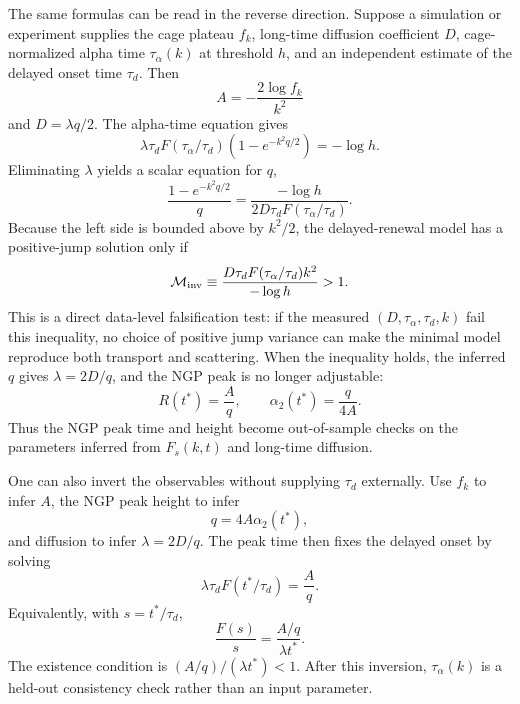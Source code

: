 \documentclass[aps,preprint,onecolumn,superscriptaddress,nofootinbib]{revtex4-2}
\begin{document}
The same formulas can be read in the reverse direction. Suppose a simulation or
experiment supplies the cage plateau $f_k$, long-time diffusion coefficient
$D$, cage-normalized alpha time $\tau_\alpha(k)$ at threshold $h$, and an
independent estimate of the delayed onset time $\tau_d$. Then
\begin{equation}
  A=-\frac{2\log f_k}{k^2}
\end{equation}
and $D=\lambda q/2$. The alpha-time equation gives
\begin{equation}
  \lambda\tau_dF(\tau_\alpha/\tau_d)
  \left(1-e^{-k^2q/2}\right)=-\log h.
\end{equation}
Eliminating $\lambda$ yields a scalar equation for $q$,
\begin{equation}
  \frac{1-e^{-k^2q/2}}{q}=
  \frac{-\log h}{2D\tau_dF(\tau_\alpha/\tau_d)}.
\end{equation}
Because the left side is bounded above by $k^2/2$, the delayed-renewal model
has a positive-jump solution only if
\begin{equation}
  \mathcal{M}_{\rm inv}\equiv
  \frac{D\tau_dF(\tau_\alpha/\tau_d)k^2}{-\log h}>1.
\end{equation}
This is a direct data-level falsification test: if the measured
$(D,\tau_\alpha,\tau_d,k)$ fail this inequality, no choice of positive jump
variance can make the minimal model reproduce both transport and scattering.
When the inequality holds, the inferred $q$ gives $\lambda=2D/q$, and the NGP
peak is no longer adjustable:
\begin{equation}
  R(t^\ast)=\frac{A}{q},\qquad
  \alpha_2(t^\ast)=\frac{q}{4A}.
\end{equation}
Thus the NGP peak time and height become out-of-sample checks on the parameters
inferred from $F_s(k,t)$ and long-time diffusion.

One can also invert the observables without supplying $\tau_d$ externally. Use
$f_k$ to infer $A$, the NGP peak height to infer
\begin{equation}
  q=4A\alpha_2(t^\ast),
\end{equation}
and diffusion to infer $\lambda=2D/q$. The peak time then fixes the delayed
onset by solving
\begin{equation}
  \lambda\tau_d F(t^\ast/\tau_d)=\frac{A}{q}.
\end{equation}
Equivalently, with $s=t^\ast/\tau_d$,
\begin{equation}
  \frac{F(s)}{s}=\frac{A/q}{\lambda t^\ast}.
\end{equation}
The existence condition is $(A/q)/(\lambda t^\ast)<1$. After this inversion,
$\tau_\alpha(k)$ is a held-out consistency check rather than an input parameter.
\end{document}
